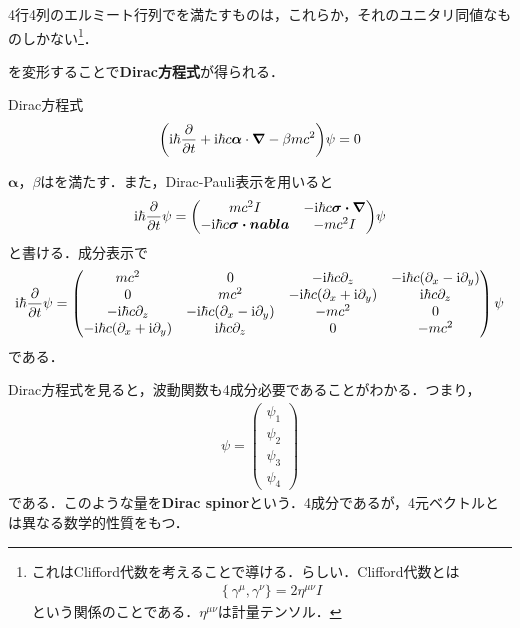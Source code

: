 \documentclass{report}
\begin{document}
4行4列のエルミート行列でを満たすものは，これらか，それのユニタリ同値なものしかない\footnote{
  これはClifford代数を考えることで導ける．らしい．Clifford代数とは
\begin{align}
  \{\ \gamma^\mu, \gamma^\nu\} = 2\eta^{\mu\nu} I
\end{align}
という関係のことである．$\eta^{\mu\nu}$は計量テンソル．
}．

を変形することで\textbf{Dirac方程式}が得られる．
\begin{itembox}[l]{Dirac方程式}
\begin{align}
  \qty(\mathrm{i}\hbar \frac{\partial}{\partial t} + \mathrm{i} \hbar c \bm{\alpha}\cdot \grad - \beta mc^2)\psi = 0
\end{align}
\end{itembox}
$\bm{\alpha}$，$\beta$はを満たす．また，Dirac-Pauli表示を用いると
\begin{align}
  \i\hbar \pdv{t}\psi = 
  \mqty(mc^2 I & -\i\hbar c\bm{\sigma\cdot\bm{\nabla} } \\ 
    -\i\hbar c\bm{\sigma\cdot\bm{nabla} } & -mc^2 I
    )\psi
\end{align}
と書ける．成分表示で
\begin{align}
  \label{dirac-eq-matrix}
  \mathrm{i}\hbar\frac{\partial}{\partial t}\psi =
  \begin{pmatrix}
    mc^2 & 0 & -\mathrm{i}\hbar c\partial_z & -\mathrm{i}\hbar c(\partial_x -\mathrm{i} \partial_y)\\
    0 & mc^2 & -\mathrm{i}\hbar c(\partial_x +\mathrm{i} \partial_y) & \mathrm{i}\hbar c\partial_z \\
    -\mathrm{i}\hbar c\partial_z & -\mathrm{i}\hbar c(\partial_x -\mathrm{i} \partial_y) & -mc^2 & 0\\
    -\mathrm{i}\hbar c(\partial_x +\mathrm{i} \partial_y) & \mathrm{i}\hbar c\partial_z & 0 & -mc^2
  \end{pmatrix}
  \psi
\end{align}
である．

Dirac方程式を見ると，波動関数も4成分必要であることがわかる．つまり，
\begin{align}
  \psi = 
  \begin{pmatrix}
    \psi_1\\\psi_2\\\psi_3\\\psi_4
  \end{pmatrix}
\end{align}
である．このような量を\textbf{Dirac spinor}という．4成分であるが，4元ベクトルとは異なる数学的性質をもつ．
\end{document}
